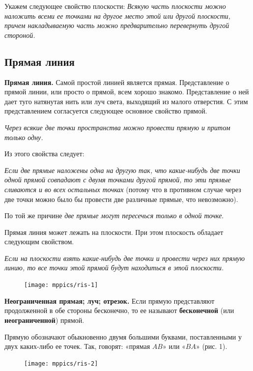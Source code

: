 \documentclass[oneside]{book}
\begin{document}
Укажем следующее свойство плоскости:
\textit{Всякую часть плоскости можно наложить всеми ее точками на другое место этой или другой плоскости, причем накладываемую часть можно предварительно перевернуть другой стороной.}

\subsection*{Прямая линия}

\textbf{Прямая линия.}
Самой простой линией является прямая.
Представление о прямой линии, или просто о прямой, всем хорошо знакомо.
Представление о ней дает туго натянутая нить или луч света, выходящий из малого отверстия.
С этим представлением согласуется следующее основное свойство прямой.

\textit{Через всякие две точки пространства можно провести прямую и притом только одну.}

Из этого свойства следует:

\textit{Если две прямые наложены одна на другую так, что какие-нибудь две точки одной прямой совпадают с двумя точками другой прямой, то эти прямые сливаются и во всех остальных точках} (потому что в противном случае через две точки можно было бы провести две различные прямые, что невозможно).

По той же причине \textit{две прямые могут пересечься только в одной точке}.

Прямая линия может лежать на плоскости.
При этом плоскость обладает следующим свойством.

\textit{Если на плоскости взять какие-нибудь две точки и провести через них прямую линию, то все точки этой прямой будут находиться в этой плоскости.}

\begin{figure}
\texttt{[image: mppics/ris-1]}
\caption{}
\end{figure}

\textbf{Неограниченная прямая; луч; отрезок.}
Если прямую представляют продолженной в обе стороны бесконечно, то ее называют \textbf{бесконечной} (или \textbf{неограниченной}) прямой.

Прямую обозначают обыкновенно двумя большими буквами, поставленными у двух каких-либо ее точек.
Так, говорят:
«прямая $AB$» или «$BA$» (рис. 1).

\begin{figure}
\texttt{[image: mppics/ris-2]}
\caption{}
\end{figure}
\end{document}
